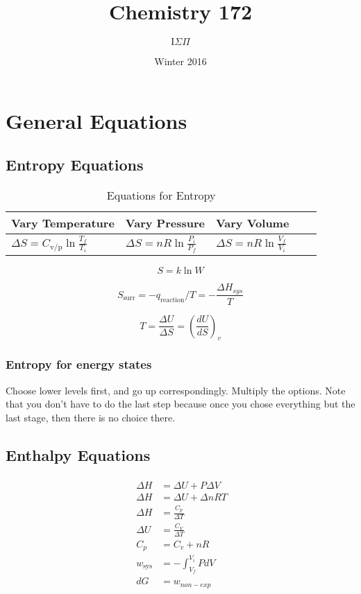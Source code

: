 \documentclass{article}
\title{Chemistry 172}
\author{$\text{I} \Sigma \Pi$}
\date{Winter 2016}
\begin{document}
\maketitle

\section{General Equations}


\subsection{Entropy Equations}

\begin{table}[h]
\centering
\caption{Equations for Entropy}
\label{my-label}
\def\arraystretch{1.5}
\begin{tabular}{|l|l|l|l|l|}
\hline
Vary Temperature & Vary Pressure & Vary Volume   \\
\hline
$\Delta S = C_\text{v/p}\ln{\frac{T_f}{T_i}}$   & $\Delta S = nR\ln{\frac{P_i}{P_f}}$ & $\Delta S = nR\ln{\frac{V_f}{V_i}}$ \\
\hline
\end{tabular}
\end{table}

\begin{equation*}
S = k\ln{W}
\end{equation*}

\begin{equation*}
S_{\text{surr}} = - q_{\text{reaction}}/T = - \frac{\Delta H_{sys}}{T}
\end{equation*}

\[
T = \frac{\Delta U}{\Delta S} = (\frac{dU}{dS})_v
\]

\subsubsection{Entropy for energy states} 
Choose lower levels first, and go up correspondingly. Multiply the options. Note that you don't have to do the last step because once you chose everything but the last stage, then there is no choice there. 



\subsection{Enthalpy Equations}
\begin{align*}
\begin{split}
\
\Delta H &= \Delta U + P \Delta V \\ 
\
\Delta H &= \Delta U + \Delta n RT\\
\
\Delta H &= \frac{C_p}{\Delta T}\\
\
\Delta U &= \frac{C_V}{\Delta T}\\
\
C_p &= C_v + nR\\
\
w_\text{sys} & = - \int_{V_f}^{V_i} P dV\\
\
dG & = w_{non-exp}\\
\end{split}
\end{align*}
\end{document}
